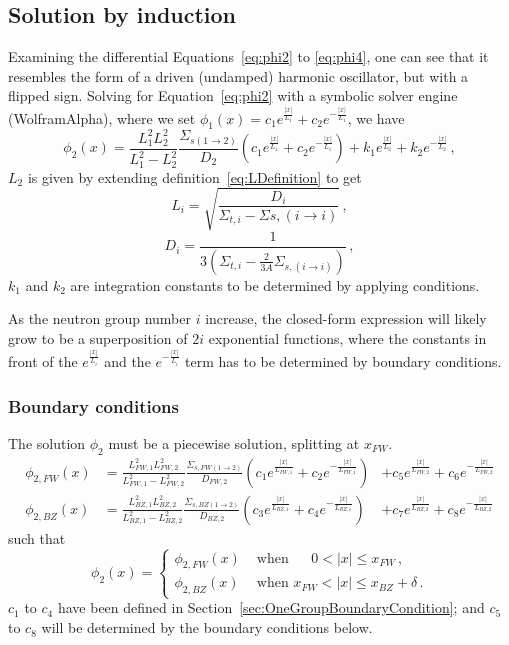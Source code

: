 \documentclass[a4paper, 12pt]{article}
\begin{document}
\subsection{Solution by induction}
Examining the differential Equations~\ref{eq:phi2} to \ref{eq:phi4}, one can see that it resembles the form of a driven (undamped) harmonic oscillator, but with a flipped sign. 
Solving for Equation~\ref{eq:phi2} with a symbolic solver engine (WolframAlpha), where we set $\phi_1(x) = c_1 e^{\frac{|x|}{L_1}} + c_2 e^{-\frac{|x|}{L_1}}$, we have
\begin{equation}\label{eq:phi2ClosedForm}
    \phi_2(x) = \frac{L_1^2 L_2^2}{L_1^2 - L_2^2}\frac{\Sigma_{s(1\rightarrow 2)}}{D_2} \left(c_1 e^{\frac{|x|}{L_1}} + c_2 e^{-\frac{|x|}{L_1}}\right) + k_1 e^{\frac{|x|}{L_2}} + k_2 e^{-\frac{|x|}{L_2}}\,,
\end{equation}
$L_2$ is given by extending definition~\ref{eq:LDefinition} to get $$L_i = \sqrt{\frac{D_i}{\Sigma_{t,i} - \Sigma{s,(i\rightarrow i)}}}\,,$$
$$D_i = \frac{1}{3(\Sigma_{t,i} - \frac{2}{3A}\Sigma_{s,(i\rightarrow i)})}\,,$$
$k_1$ and $k_2$ are integration constants to be determined by applying conditions.

As the neutron group number $i$ increase, the closed-form expression will likely grow to be a superposition of $2i$ exponential functions, where the constants in front of the $e^{\frac{|x|}{L_i}}$ and the $e^{-\frac{|x|}{L_i}}$ term has to be determined by boundary conditions.

\subsubsection{Boundary conditions}\label{sec:MultiGroupBoundaryCondition}
The solution $\phi_2$ must be a piecewise solution, splitting at $x_{FW}$.
\begin{align}
    \phi_{2,FW}(x)&= \frac{L_{FW,1}^2 L_{FW,2}^2}{L_{FW,1}^2 - L_{FW,2}^2}\frac{\Sigma_{s,FW(1\rightarrow 2)}}{D_{FW,2}} \left(c_1 e^{\frac{|x|}{L_{FW,1}}} + c_2 e^{-\frac{|x|}{L_{FW,1}}}\right)&+c_5 e^{\frac{|x|}{L_{FW,2}}} + c_6 e^{-\frac{|x|}{L_{FW,2}}}\\
    \phi_{2,BZ}(x)&= \frac{L_{BZ,1}^2 L_{BZ,2}^2}{L_{BZ,1}^2 - L_{BZ,2}^2}\frac{\Sigma_{s,BZ(1\rightarrow 2)}}{D_{BZ,2}} \left(c_3 e^{\frac{|x|}{L_{BZ,1}}} + c_4 e^{-\frac{|x|}{L_{BZ,1}}}\right)&+c_7 e^{\frac{|x|}{L_{BZ,2}}} + c_8 e^{-\frac{|x|}{L_{BZ,2}}}
\end{align}
such that
\begin{equation}
    \phi_2(x) =
    \begin{cases}
    \phi_{2,FW}(x) & \text{ when }\quad\;     0<|x|\le x_{FW}\,,\\
    \phi_{2,BZ}(x) & \text{ when }x_{FW}<|x|\le x_{BZ} + \delta \,.
    \end{cases}
\end{equation}
$c_1$ to $c_4$ have been defined in Section~\ref{sec:OneGroupBoundaryCondition}; and $c_5$ to $c_8$ will be determined by the boundary conditions below.
\end{document}
